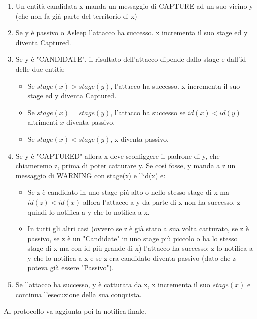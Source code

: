 \begin{enumerate}
    \item Un entità candidata x manda un messaggio di CAPTURE ad un suo vicino y
          (che non fa già parte del territorio di x)
    \item Se y è passivo o Asleep l'attacco ha successo. x incrementa il suo stage
          ed y diventa Captured.
    \item Se y è "CANDIDATE", il risultato dell'attacco dipende dallo stage e
          dall'id delle due entità:
          \begin{itemize}
              \item Se $stage(x) > stage(y)$, l'attacco ha successo. x incrementa il
                    suo stage ed y diventa Captured.
              \item Se $stage(x) = stage(y)$, l'attacco ha successo se $id(x) <
                        id(y)$ altrimenti $x$ diventa passivo.
              \item Se $stage(x) < stage(y)$, x diventa passivo.
          \end{itemize}
    \item Se y è "CAPTURED" allora x deve sconfiggere il padrone di y, che
          chiameremo z, prima di poter catturare y. Se così fosse, y manda a z un
          messaggio di WARNING con stage(x) e l'id(x) e:
          \begin{itemize}
              \item Se z è candidato in uno stage più alto o nello stesso stage di x
                    ma $id(z) < id(x)$ allora l'attacco a y da parte di x non ha successo.
                    z quindi lo notifica a y che lo notifica a x.
              \item In tutti gli altri casi (ovvero se z è già stato a sua volta
                    catturato, se z è passivo, se z è un "Candidate" in uno stage più
                    piccolo o ha lo stesso stage di x ma con id più grande di x) l'attacco
                    ha successo; z lo notifica a y che lo notifica a x e se z era
                    candidato diventa passivo (dato che z poteva già essere "Passivo").
          \end{itemize}
    \item Se l'attacco ha successo, y è catturata da x, x incrementa il suo
          $stage(x)$ e continua l'esecuzione della sua conquista.
\end{enumerate}
Al protocollo va aggiunta poi la notifica finale. \\
